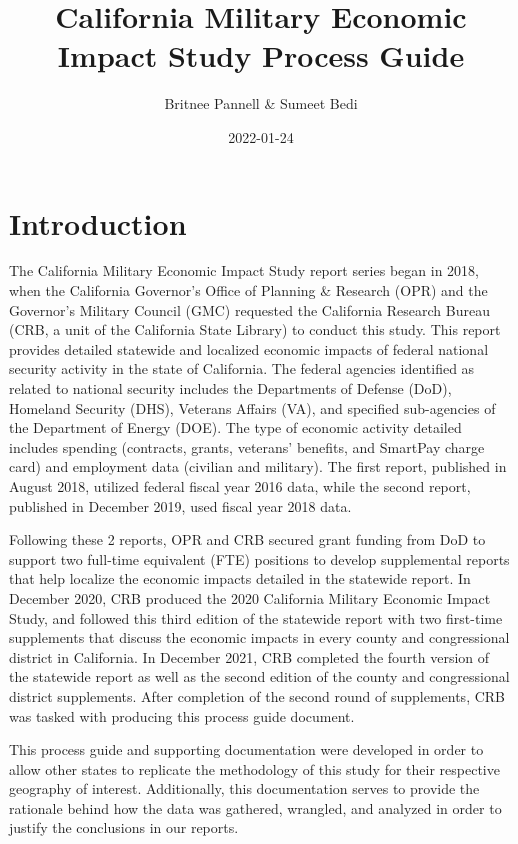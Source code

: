 \documentclass[
]{book}
\title{California Military Economic Impact Study Process Guide}
\author{Britnee Pannell \& Sumeet Bedi}
\date{2022-01-24}
\begin{document}
\maketitle

{
\setcounter{tocdepth}{1}
\tableofcontents
}
\hypertarget{introduction}{%
\chapter{Introduction}\label{introduction}}

The California Military Economic Impact Study report series began in 2018, when the California Governor's Office of Planning \& Research (OPR) and the Governor's Military Council (GMC) requested the California Research Bureau (CRB, a unit of the California State Library) to conduct this study. This report provides detailed statewide and localized economic impacts of federal national security activity in the state of California. The federal agencies identified as related to national security includes the Departments of Defense (DoD), Homeland Security (DHS), Veterans Affairs (VA), and specified sub-agencies of the Department of Energy (DOE). The type of economic activity detailed includes spending (contracts, grants, veterans' benefits, and SmartPay charge card) and employment data (civilian and military). The first report, published in August 2018, utilized federal fiscal year 2016 data, while the second report, published in December 2019, used fiscal year 2018 data.

Following these 2 reports, OPR and CRB secured grant funding from DoD to support two full-time equivalent (FTE) positions to develop supplemental reports that help localize the economic impacts detailed in the statewide report. In December 2020, CRB produced the 2020 California Military Economic Impact Study, and followed this third edition of the statewide report with two first-time supplements that discuss the economic impacts in every county and congressional district in California. In December 2021, CRB completed the fourth version of the statewide report as well as the second edition of the county and congressional district supplements. After completion of the second round of supplements, CRB was tasked with producing this process guide document.

This process guide and supporting documentation were developed in order to allow other states to replicate the methodology of this study for their respective geography of interest. Additionally, this documentation serves to provide the rationale behind how the data was gathered, wrangled, and analyzed in order to justify the conclusions in our reports.
\end{document}
